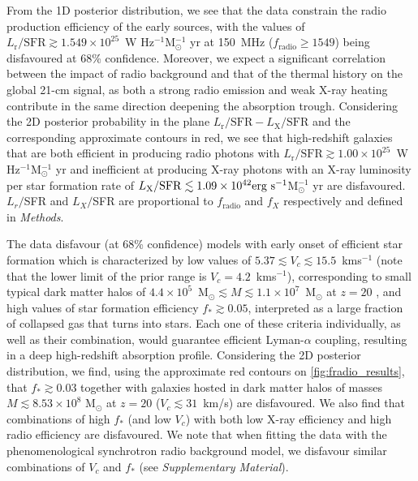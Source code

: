 From the 1D posterior distribution, we see that the data constrain the radio production efficiency of the early sources, with the values of $L_\mathrm{r}/\mathrm{SFR} \gtrsim 1.549 \times 10^{25}$~W Hz$^{-1}$M$_\odot^{-1}$ yr at 150~MHz ($f_\mathrm{radio} \geq 1549$) being disfavoured at 68\% confidence. Moreover, we expect a significant correlation between the impact of radio background and that of the thermal history on the global 21-cm signal, as both a strong radio emission and weak X-ray heating contribute in the same direction deepening the absorption trough. Considering the 2D posterior probability in the plane $L_\mathrm{r}/\mathrm{SFR}-L_\mathrm{X}/\mathrm{SFR}$ and the corresponding approximate contours in red, we see that high-redshift galaxies that are both efficient in producing radio photons 
with $L_\mathrm{r}/\mathrm{SFR} \gtrsim 1.00\times10^{25}$~W Hz$^{-1}$M$_\odot^{-1}$ yr 
and inefficient at producing X-ray photons 
with an X-ray luminosity per star formation rate of $L_\mathrm{X}/\mathrm{SFR} \lesssim 1.09\times10^{42}\textnormal{erg~s}^{-1}$M$_\odot^{-1}$ yr
are disfavoured. $L_{r}/$SFR and $L_{X}/$SFR are proportional to $f_\mathrm{radio}$ and $f_X$ respectively and defined in \textit{Methods}.

The data disfavour (at 68\% confidence) models with early onset of efficient star formation which is characterized by low values of $5.37 \lesssim V_c \lesssim 15.5$~kms$^{-1}$ (note that the lower limit of the prior range is $V_c = 4.2$~kms$^{-1}$), corresponding to small typical dark matter halos of $4.4\times10^{5}$~M$_\odot \lesssim M \lesssim 1.1\times10^{7}$~M$_\odot$ at $z = 20$ \citep[e.g.][]{Reis2020},  and high values of star formation efficiency $f_* \gtrsim 0.05$, interpreted as a large fraction of collapsed gas that turns into stars. Each one of these  criteria individually, as well as their combination, would guarantee efficient Lyman-$\alpha$ coupling, resulting in a deep high-redshift absorption profile. Considering the 2D posterior distribution, we find, using the approximate red contours on \cref{fig:fradio_results}, that $f_* \gtrsim 0.03$
together with galaxies hosted in dark matter halos of masses $M \lesssim 8.53\times10^8$ M$_\odot$ at $z = 20$ ($V_c \lesssim 31$~km/s) are disfavoured. We also find that combinations of high $f_*$ (and low $V_c$) with both low X-ray efficiency and high radio efficiency are disfavoured. We note that when fitting the data with the phenomenological synchrotron radio background model, we disfavour similar combinations of $V_c$ and $f_*$ (see \textit{Supplementary Material}).

